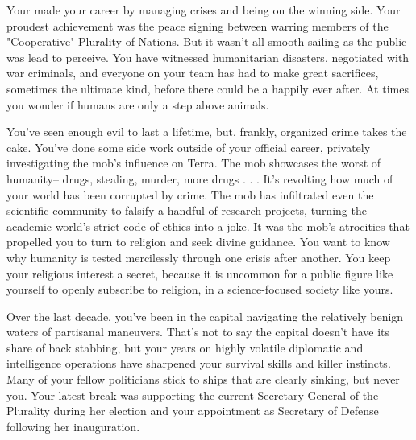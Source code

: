 \documentclass[char]{guildcamp3}
\begin{document}
\name{\cPoliOne{}}






Your made your career by managing crises and being on the winning side. Your proudest achievement was the peace signing between warring members of the "Cooperative" Plurality of Nations. But it wasn't all smooth sailing as the public was lead to perceive. You have witnessed humanitarian disasters, negotiated with war criminals, and everyone on your team has had to make great sacrifices, sometimes the ultimate kind, before there could be a happily ever after. At times you wonder if humans are only a step above animals. 

You've seen enough evil to last a lifetime, but, frankly, organized crime takes the cake. You've done some side work outside of your official career, privately investigating the mob's influence on Terra. The mob showcases the worst of humanity-- drugs, stealing, murder, more drugs . . . It's revolting how much of your world has been corrupted by crime. The mob has infiltrated even the scientific community to falsify a handful of research projects, turning the academic world's strict code of ethics into a joke. It was the mob's atrocities that propelled you to turn to religion and seek divine guidance. You want to know why humanity is tested mercilessly through one crisis after another. You keep your religious interest a secret, because it is uncommon for a public figure like yourself to openly subscribe to religion, in a science-focused society like yours. 

Over the last decade, you've been in the capital navigating the relatively benign waters of partisanal maneuvers. That's not to say the capital doesn't have its share of back stabbing, but your years on highly volatile diplomatic and intelligence operations have sharpened your survival skills and killer instincts. Many of your fellow politicians stick to ships that are clearly sinking, but never you. Your latest break was supporting the current Secretary-General of the Plurality during her election and your appointment as Secretary of Defense following her inauguration.
\end{document}
